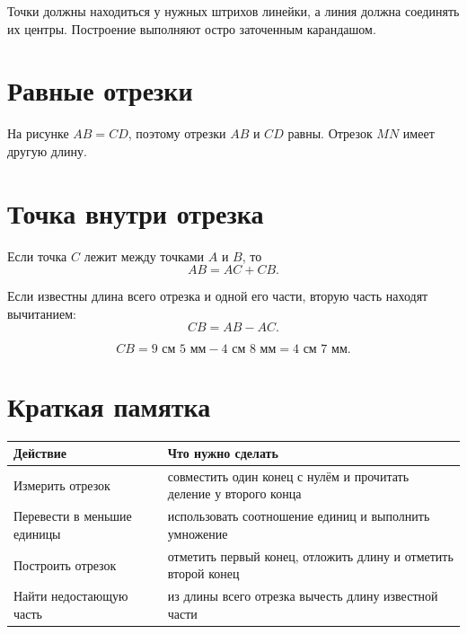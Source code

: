 \begin{notebox}
  Точки должны находиться у нужных штрихов линейки, а линия должна соединять
  их центры. Построение выполняют остро заточенным карандашом.
\end{notebox}

\section{Равные отрезки}

\equalcontrastingsegmentsfigure

На рисунке \(AB=CD\), поэтому отрезки \(AB\) и \(CD\) равны. Отрезок
\(MN\) имеет другую длину.

\section{Точка внутри отрезка}

\partssegmentfigure

\begin{propertybox}
  Если точка \(C\) лежит между точками \(A\) и \(B\), то
  \[
    AB=AC+CB.
  \]
\end{propertybox}

Если известны длина всего отрезка и одной его части, вторую часть находят
вычитанием:
\[
  CB=AB-AC.
\]

\partsproblemfigure

\[
  CB=9\text{ см }5\text{ мм}-4\text{ см }8\text{ мм}
    =4\text{ см }7\text{ мм}.
\]

\section{Краткая памятка}

\begin{center}
  \renewcommand{\arraystretch}{1.38}
  \begin{tabularx}{\textwidth}{
    >{\raggedright\arraybackslash}p{}
    >{\raggedright\arraybackslash}X}
    \toprule
    \rowcolor{TableHeader}
    Действие & Что нужно сделать \\
    \midrule
    Измерить отрезок
      & совместить один конец с нулём и прочитать деление у второго конца \\
    \addlinespace[0.2em]
    Перевести в меньшие единицы
      & использовать соотношение единиц и выполнить умножение \\
    \addlinespace[0.2em]
    Построить отрезок
      & отметить первый конец, отложить длину и отметить второй конец \\
    \addlinespace[0.2em]
    Найти недостающую часть
      & из длины всего отрезка вычесть длину известной части \\
    \bottomrule
  \end{tabularx}
\end{center}

